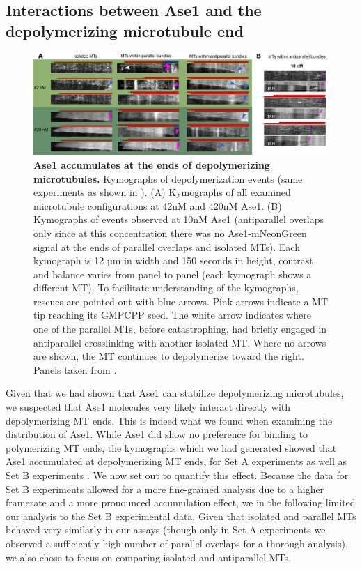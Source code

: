 \subsection{Interactions between Ase1 and the depolymerizing microtubule end}
\label{sec:ase12}
\begin{figure}[h]
    \centering
    \includegraphics[width=1\linewidth]{Figures/ase2a.png}
    \caption[Ase1 accumulates at the ends of depolymerizing microtubules.]{\textbf{Ase1 accumulates at the ends of depolymerizing microtubules.} Kymographs of depolymerization events (same experiments as shown in ). (A) Kymographs of all examined microtubule configurations at 42nM and 420nM Ase1. (B) Kymographs of events observed at 10nM Ase1 (antiparallel overlaps only since at this concentration there was no Ase1-mNeonGreen signal at the ends of parallel overlaps and isolated MTs). Each kymograph is 12 µm in width and 150 seconds in height, contrast and balance varies from panel to panel (each kymograph shows a different MT). To facilitate understanding of the kymographs, rescues are pointed out with blue arrows. Pink arrows indicate a MT tip reaching its GMPCPP seed. The white arrow indicates where one of the parallel MTs, before catastrophing, had briefly engaged in antiparallel crosslinking with another isolated MT. Where no arrows are shown, the MT continues to depolymerize toward the right. Panels taken from \cite{Krattenmacher2024}.
        }\label{ase2a}
\end{figure}
Given that we had shown that Ase1 can stabilize depolymerizing microtubules, we suspected that Ase1 molecules very likely interact directly with depolymerizing MT ends. This is indeed what we found when examining the distribution of Ase1. While Ase1 did show no preference for binding to polymerizing MT ends, the kymographs which we had generated showed that Ase1 accumulated at depolymerizing MT ends, for Set A experiments  as well as Set B experiments . We now set out to quantify this effect. Because the data for Set B experiments allowed for a more fine-grained analysis due to a higher framerate and a more pronounced accumulation effect, we in the following limited our analysis to the Set B experimental data. Given that isolated and parallel MTs behaved very similarly in our assays (though only in Set A experiments we observed a sufficiently high number of parallel overlaps for a thorough analysis), we also chose to focus on comparing isolated and antiparallel MTs.\par
